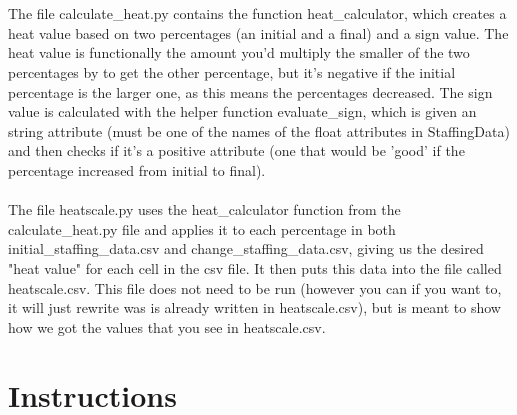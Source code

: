 \documentclass[fontsize=11pt]{article}
\begin{document}
    \\
    \\
    The file calculate\_heat.py contains the function heat\_calculator, which creates a heat value based on two percentages (an initial and a final) and a sign value. The heat value is functionally the amount you'd multiply the smaller of the two percentages by to get the other percentage, but it's negative if the initial percentage is the larger one, as this means the percentages decreased. The sign value is calculated with the helper function evaluate\_sign, which is given an string attribute (must be one of the names of the float attributes in StaffingData) and then checks if it's a positive attribute (one that would be 'good' if the percentage increased from initial to final).
    \\
    \\
    The file heatscale.py uses the heat\_calculator function from the calculate\_heat.py file and applies it to each percentage in both initial\_staffing\_data.csv and change\_staffing\_data.csv, giving us the desired "heat value" for each cell in the csv file. It then puts this data into the file called heatscale.csv. This file does not need to be run (however you can if you want to, it will just rewrite was is already written in heatscale.csv), but is meant to show how we got the values that you see in heatscale.csv.


    \section*{Instructions}
\end{document}
